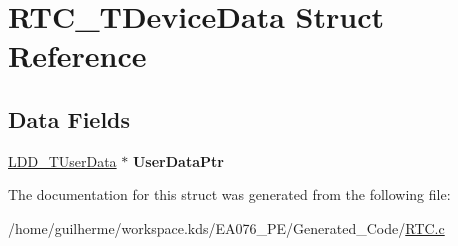 \hypertarget{struct_r_t_c___t_device_data}{}\section{R\+T\+C\+\_\+\+T\+Device\+Data Struct Reference}
\label{struct_r_t_c___t_device_data}
\subsection*{Data Fields}
\begin{DoxyCompactItemize}
\item 
\mbox{\label{struct_r_t_c___t_device_data_a7bc26beaf6e975bf8debb8be29eae294}} 
\hyperlink{group___p_e___types__module_ga0b66a73f87238a782318aa0be7578e35}{L\+D\+D\+\_\+\+T\+User\+Data} $\ast$ {\bfseries User\+Data\+Ptr}
\end{DoxyCompactItemize}


The documentation for this struct was generated from the following file\+:\begin{DoxyCompactItemize}
\item 
/home/guilherme/workspace.\+kds/\+E\+A076\+\_\+\+P\+E/\+Generated\+\_\+\+Code/\hyperlink{_r_t_c_8c}{R\+T\+C.\+c}\end{DoxyCompactItemize}
